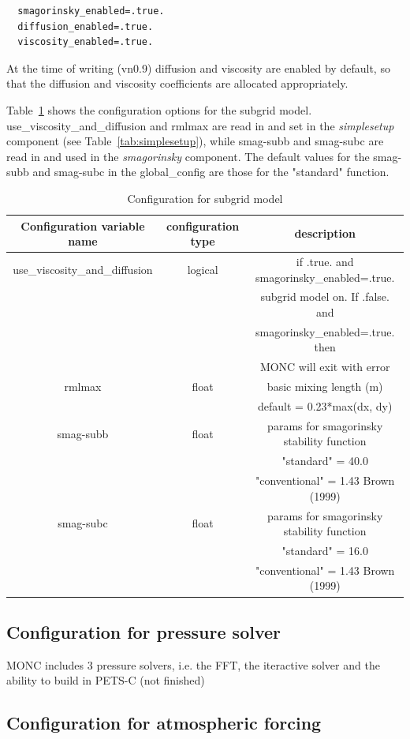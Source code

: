 \documentclass[a4paper,11pt]{article}
\begin{document}
\begin{lstlisting}
  smagorinsky_enabled=.true.
  diffusion_enabled=.true.
  viscosity_enabled=.true.
\end{lstlisting}

At the time of writing (vn0.9) diffusion and viscosity are enabled by default, so that
the diffusion and viscosity coefficients are allocated appropriately.

Table~\ref{tab:subgrid_model} shows the configuration options for the subgrid model.
use\_viscosity\_and\_diffusion and rmlmax are read in and set in the \emph{simplesetup}
component (see Table~\ref{tab:simplesetup}), while smag-subb and smag-subc are read in and used in the
\emph{smagorinsky} component. The default values for the smag-subb and smag-subc
in the global\_config are those for the "standard" function.

\begin{table}[H]
\protect\caption{Configuration for subgrid model}
\label{tab:subgrid_model}
\begin{tabular}{|c|c|c|}
\hline
Configuration variable name & configuration type & description\tabularnewline
\hline
\hline
use\_viscosity\_and\_diffusion & logical & if .true. and smagorinsky\_enabled=.true. \tabularnewline
 &  & subgrid model on. If .false. and \tabularnewline
 &  & smagorinsky\_enabled=.true. then \tabularnewline
 &  & MONC will exit with error \tabularnewline
\hline
  rmlmax & float & basic mixing length (m)  \tabularnewline
  & & default = 0.23*max(dx, dy) \tabularnewline
  \hline
smag-subb & float &  params for smagorinsky stability function \tabularnewline
 &  & "standard" = 40.0 \tabularnewline
 &  & "conventional" = 1.43 Brown (1999) \tabularnewline
\hline
smag-subc & float &  params for smagorinsky stability function \tabularnewline
 &  & "standard" = 16.0 \tabularnewline
 &  & "conventional" = 1.43 Brown (1999) \tabularnewline
\hline
\hline
\end{tabular}
\end{table}

\subsection{Configuration for pressure solver}

MONC includes 3 pressure solvers, i.e. the FFT, the iteractive solver and the
ability to build in PETS-C (not finished)

\subsection{Configuration for atmospheric forcing}
\end{document}
